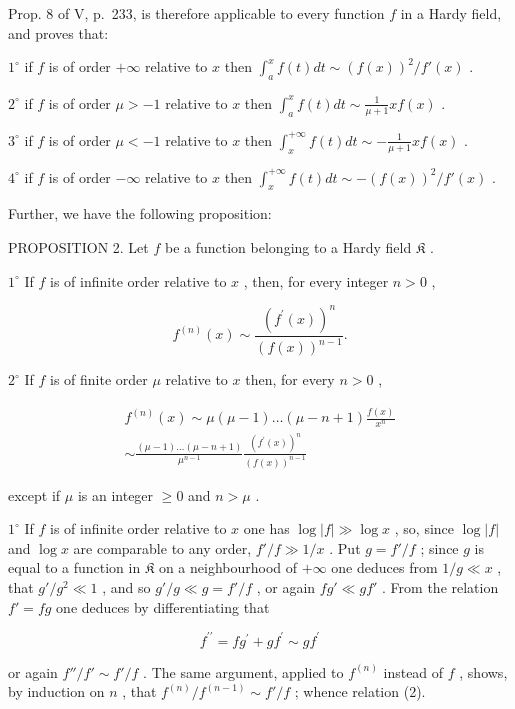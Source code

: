 Prop. 8 of V, p.~233, is therefore applicable to every function \(f\) in a Hardy field, and proves that:

\(1^{\circ}\) if \(f\) is of order \(+\infty\) relative to \(x\) then \(\int_{a}^{x} f(t) dt \sim (f(x))^{2} / f'(x)\) .

\(2^{\circ}\) if \(f\) is of order \(\mu > -1\) relative to \(x\) then \(\int_{a}^{x} f(t) dt \sim \frac{1}{\mu + 1} xf(x)\) .

\(3^{\circ}\) if \(f\) is of order \(\mu < -1\) relative to \(x\) then \(\int_{x}^{+\infty} f(t) dt \sim -\frac{1}{\mu + 1} xf(x)\) .

\(4^{\circ}\) if \(f\) is of order \(-\infty\) relative to \(x\) then \(\int_{x}^{+\infty} f(t) dt \sim -(f(x))^{2} / f'(x)\) .

Further, we have the following proposition:

PROPOSITION 2. Let \(f\) be a function belonging to a Hardy field \(\mathfrak{K}\) .

\(1^{\circ}\) If \(f\) is of infinite order relative to \(x\) , then, for every integer \(n > 0\) ,

\[
f ^ {(n)} (x) \sim \frac {(f ^ {\prime} (x)) ^ {n}}{(f (x)) ^ {n - 1}}.\tag{2}
\]

\(2^{\circ}\) If \(f\) is of finite order \(\mu\) relative to \(x\) then, for every \(n > 0\) ,

\[
\begin{array}{c} f ^ {(n)} (x) \sim \mu (\mu - 1) \ldots (\mu - n + 1) \frac {f (x)}{x ^ {n}} \\ \sim \frac {(\mu - 1) \ldots (\mu - n + 1)}{\mu^ {n - 1}} \frac {(f ^ {\prime} (x)) ^ {n}}{(f (x)) ^ {n - 1}} \end{array}\tag{3}
\]

except if \(\mu\) is an integer \(\geqslant 0\) and \(n > \mu\) .

\(1^{\circ}\) If \(f\) is of infinite order relative to \(x\) one has \(\log |f| \gg \log x\) , so, since \(\log |f|\) and \(\log x\) are comparable to any order, \(f'/f \gg 1/x\) . Put \(g = f'/f\) ; since \(g\) is equal to a function in \(\mathfrak{K}\) on a neighbourhood of \(+\infty\) one deduces from \(1/g \ll x\) , that \(g'/g^{2} \ll 1\) , and so \(g'/g \ll g = f'/f\) , or again \(fg' \ll gf'\) . From the relation \(f' = fg\) one deduces by differentiating that

\[
f ^ {\prime \prime} = f g ^ {\prime} + g f ^ {\prime} \sim g f ^ {\prime}
\]

or again \(f'' / f' \sim f' / f\) . The same argument, applied to \(f^{(n)}\) instead of \(f\) , shows, by induction on \(n\) , that \(f^{(n)} / f^{(n-1)} \sim f' / f\) ; whence relation (2).

